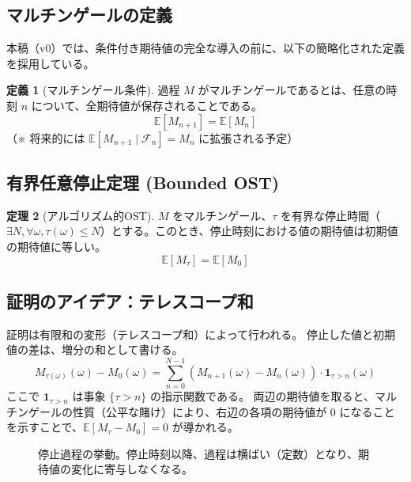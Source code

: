 \documentclass[a4paper,11pt]{ltjsarticle}
\theoremstyle{definition}
\newtheorem{definition}{定義}[section]
\newtheorem{theorem}[definition]{定理}
\newcommand{\F}{\mathcal{F}}
\newcommand{\Expect}{\mathbb{E}}
\newcommand{\Tau}{\tau}
\newcommand{\Ind}[1]{\mathbf{1}_{#1}}
\begin{document}
\subsection{マルチンゲールの定義}
本稿（v0）では、条件付き期待値の完全な導入の前に、以下の簡略化された定義を採用している。
\begin{definition}[マルチンゲール条件]
過程 $M$ がマルチンゲールであるとは、任意の時刻 $n$ について、全期待値が保存されることである。
\[ \Expect[M_{n+1}] = \Expect[M_n] \]
（※ 将来的には $\Expect[M_{n+1} \mid \F_n] = M_n$ に拡張される予定）
\end{definition}

\subsection{有界任意停止定理 (Bounded OST)}
\begin{theorem}[アルゴリズム的OST]
$M$ をマルチンゲール、$\Tau$ を有界な停止時間（$\exists N, \forall \omega, \Tau(\omega) \le N$）とする。このとき、停止時刻における値の期待値は初期値の期待値に等しい。
\[ \Expect[M_\Tau] = \Expect[M_0] \]
\end{theorem}

\subsection{証明のアイデア：テレスコープ和}
証明は有限和の変形（テレスコープ和）によって行われる。
停止した値と初期値の差は、増分の和として書ける。
\[ M_{\Tau(\omega)}(\omega) - M_0(\omega) = \sum_{n=0}^{N-1} (M_{n+1}(\omega) - M_n(\omega)) \cdot \Ind{\Tau > n}(\omega) \]
ここで $\Ind{\Tau > n}$ は事象 $\{\Tau > n\}$ の指示関数である。
両辺の期待値を取ると、マルチンゲールの性質（公平な賭け）により、右辺の各項の期待値が $0$ になることを示すことで、$\Expect[M_\Tau - M_0] = 0$ が導かれる。

\begin{figure}[h]
\centering
{}
\caption{停止過程の挙動。停止時刻以降、過程は横ばい（定数）となり、期待値の変化に寄与しなくなる。}
\end{figure}
\end{document}
